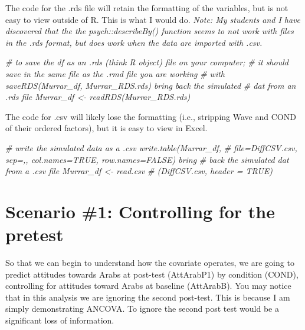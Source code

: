 \documentclass[
  11pt,
]{book}
\newenvironment{Shaded}{\begin{snugshade}}{\end{snugshade}}
\newcommand{\CommentTok}[1]{\textcolor[rgb]{0.56,0.35,0.01}{\textit{#1}}}
\begin{document}
The code for the .rds file will retain the formatting of the variables, but is not easy to view outside of R. This is what I would do. \emph{Note: My students and I have discovered that the the psych::describeBy() function seems to not work with files in the .rds format, but does work when the data are imported with .csv.}

\begin{Shaded}
\begin{Highlighting}[]
\CommentTok{\# to save the df as an .rds (think \textquotesingle{}R object\textquotesingle{}) file on your computer;}
\CommentTok{\# it should save in the same file as the .rmd file you are working}
\CommentTok{\# with saveRDS(Murrar\_df, \textquotesingle{}Murrar\_RDS.rds\textquotesingle{}) bring back the simulated}
\CommentTok{\# dat from an .rds file Murrar\_df \textless{}{-} readRDS(\textquotesingle{}Murrar\_RDS.rds\textquotesingle{})}
\end{Highlighting}
\end{Shaded}

The code for .csv will likely lose the formatting (i.e., stripping Wave and COND of their ordered factors), but it is easy to view in Excel.

\begin{Shaded}
\begin{Highlighting}[]
\CommentTok{\# write the simulated data as a .csv write.table(Murrar\_df,}
\CommentTok{\# file=\textquotesingle{}DiffCSV.csv\textquotesingle{}, sep=\textquotesingle{},\textquotesingle{}, col.names=TRUE, row.names=FALSE) bring}
\CommentTok{\# back the simulated dat from a .csv file Murrar\_df \textless{}{-} read.csv}
\CommentTok{\# (\textquotesingle{}DiffCSV.csv\textquotesingle{}, header = TRUE)}
\end{Highlighting}
\end{Shaded}

\hypertarget{scenario-1-controlling-for-the-pretest}{%
\section{Scenario \#1: Controlling for the pretest}\label{scenario-1-controlling-for-the-pretest}}

So that we can begin to understand how the covariate operates, we are going to predict attitudes towards Arabs at post-test (AttArabP1) by condition (COND), controlling for attitudes toward Arabs at baseline (AttArabB). You may notice that in this analysis we are ignoring the second post-test. This is because I am simply demonstrating ANCOVA. To ignore the second post test would be a significant loss of information.
\end{document}
